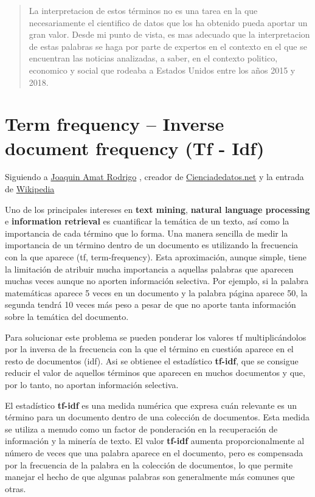 \documentclass[
  11pt,
  a4paper,
]{article}
\begin{document}
\begin{quote}
La interpretacion de estos términos no es una tarea en la que
necesariamente el cientifico de datos que los ha obtenido pueda aportar
un gran valor. Desde mi punto de vista, es mas adecuado que la
interpretacion de estas palabras se haga por parte de expertos en el
contexto en el que se encuentran las noticias analizadas, a saber, en el
contexto politico, economico y social que rodeaba a Estados Unidos entre
los años 2015 y 2018.
\end{quote}

\hypertarget{term-frequency-inverse-document-frequency-tf---idf}{%
\section{Term frequency -- Inverse document frequency (Tf -
Idf)}\label{term-frequency-inverse-document-frequency-tf---idf}}

Siguiendo a
\href{https://www.linkedin.com/in/joaquin-amat-rodrigo/?originalSubdomain=es}{Joaquin
Amat Rodrigo} , creador de
\href{https://www.cienciadedatos.net/}{Cienciadedatos.net} y la entrada
de \href{https://es.wikipedia.org/wiki/Tf-idf}{Wikipedia}

Uno de los principales intereses en \textbf{text mining},
\textbf{natural language processing} e \textbf{information retrieval} es
cuantificar la temática de un texto, así como la importancia de cada
término que lo forma. Una manera sencilla de medir la importancia de un
término dentro de un documento es utilizando la frecuencia con la que
aparece (tf, term-frequency). Esta aproximación, aunque simple, tiene la
limitación de atribuir mucha importancia a aquellas palabras que
aparecen muchas veces aunque no aporten información selectiva. Por
ejemplo, si la palabra matemáticas aparece 5 veces en un documento y la
palabra página aparece 50, la segunda tendrá 10 veces más peso a pesar
de que no aporte tanta información sobre la temática del documento.

Para solucionar este problema se pueden ponderar los valores tf
multiplicándolos por la inversa de la frecuencia con la que el término
en cuestión aparece en el resto de documentos (idf). Asi se obtienee el
estadístico \textbf{tf-idf}, que se consigue reducir el valor de
aquellos términos que aparecen en muchos documentos y que, por lo tanto,
no aportan información selectiva.

El estadístico \textbf{tf-idf} es una medida numérica que expresa cuán
relevante es un término para un documento dentro de una colección de
documentos. Esta medida se utiliza a menudo como un factor de
ponderación en la recuperación de información y la minería de texto. El
valor \textbf{tf-idf} aumenta proporcionalmente al número de veces que
una palabra aparece en el documento, pero es compensada por la
frecuencia de la palabra en la colección de documentos, lo que permite
manejar el hecho de que algunas palabras son generalmente más comunes
que otras.
\end{document}
